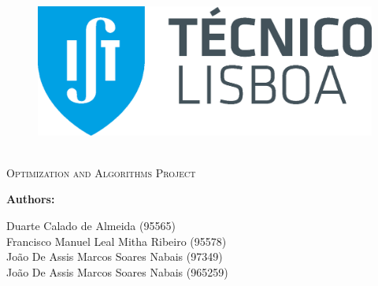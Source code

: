 \documentclass[12pt]{article}
\newcommand{\HRule}{\rule{\linewidth}{0.5mm}} %
\begin{document}
\begin{center}
    \begin{figure}
        \vspace{-1.0cm}
        \includegraphics[scale = 0.3, left]{Images/IST_A.eps} %
    \end{figure}
    \mbox{}\\[2.0cm]
    \textsc{\Huge Optimization and Algorithms Project}\\[2.5cm]
\end{center}

\begin{flushleft}
    \textbf{Authors:}
\end{flushleft}

\begin{center}
    \begin{minipage}{0.5\textwidth}
        \begin{flushleft}
            Duarte Calado de Almeida (95565)\\
            Francisco Manuel Leal Mitha Ribeiro (95578)\\
            João De Assis Marcos Soares Nabais (97349)\\ 
            João De Assis Marcos Soares Nabais (965259)
        \end{flushleft}
    \end{minipage}%
\end{center}
    
\end{document}
